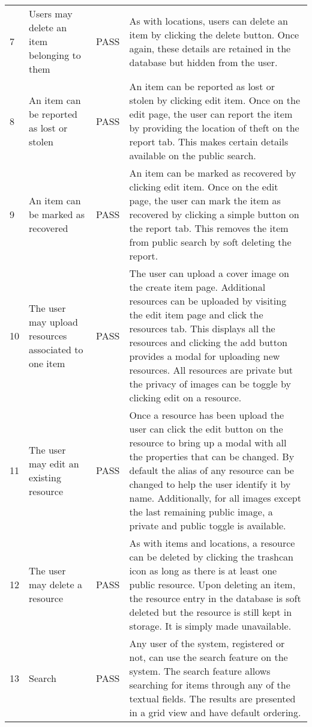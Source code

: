 \begin{longtable}{@{}p{}p{}p{}p{}@{}}
	7 & Users may delete an item belonging to them & \textcolor{PassGreen}{PASS} & As with locations, users can delete an item by clicking the delete button. Once again, these details are retained in the database but hidden from the user. \\
	
	8 & An item can be reported as lost or stolen & \textcolor{PassGreen}{PASS} & An item can be reported as lost or stolen by clicking edit item. Once on the edit page, the user can report the item by providing the location of theft on the report tab. This makes certain details available on the public search. \\
	
	9 & An item can be marked as recovered & \textcolor{PassGreen}{PASS} & An item can be marked as recovered by clicking edit item. Once on the edit page, the user can mark the item as recovered by clicking a simple button on the report tab. This removes the item from public search by soft deleting the report. \\
	
	10 & The user may upload resources associated to one item & \textcolor{PassGreen}{PASS} & The user can upload a cover image on the create item page. Additional resources can be uploaded by visiting the edit item page and click the resources tab. This displays all the resources and clicking the add button provides a modal for uploading new resources. All resources are private but the privacy of images can be toggle by clicking edit on a resource. \\
	
	11 & The user may edit an existing resource & PASS & Once a resource has been upload the user can click the edit button on the resource to bring up a modal with all the properties that can be changed. By default the alias of any resource can be changed to help the user identify it by name. Additionally, for all images except the last remaining public image, a private and public toggle is available. \\
	
	12 & The user may delete a resource & \textcolor{PassGreen}{PASS} & As with items and locations, a resource can be deleted by clicking the trashcan icon as long as there is at least one public resource. Upon deleting an item, the resource entry in the database is soft deleted but the resource is still kept in storage. It is simply made unavailable. \\
	
	13 & Search & \textcolor{PassGreen}{PASS} & Any user of the system, registered or not, can use the search feature on the system. The search feature allows searching for items through any of the textual fields. The results are presented in a grid view and have default ordering. \\
	

\end{longtable}
